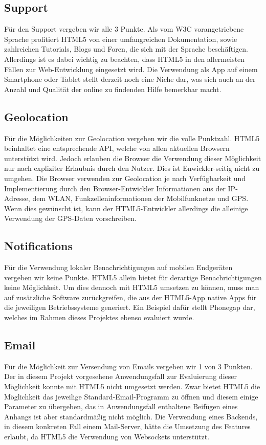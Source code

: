 \subsection{Support}
Für den Support vergeben wir alle 3 Punkte. Als vom W3C vorangetriebene Sprache profitiert HTML5 von einer umfangreichen Dokumentation, sowie zahlreichen Tutorials, Blogs und Foren, die sich mit der Sprache beschäftigen. Allerdings ist es dabei wichtig zu beachten, dass HTML5 in den allermeisten Fällen zur Web-Entwicklung eingesetzt wird. Die Verwendung als App auf einem Smartphone oder Tablet stellt derzeit noch eine Niche dar, was sich auch an der Anzahl und Qualität der online zu findenden Hilfe bemerkbar macht.

\subsection{Geolocation}
Für die Möglichkeiten zur Geolocation vergeben wir die volle Punktzahl. HTML5 beinhaltet eine entsprechende API, welche von allen aktuellen Browsern unterstützt wird. Jedoch erlauben die Browser die Verwendung dieser Möglichkeit nur nach expliziter Erlaubnis durch den Nutzer. Dies ist Enwickler-seitig nicht zu umgehen. Die Browser verwenden zur Geolocation je nach Verfügbarkeit und Implementierung durch den Browser-Entwickler Informationen aus der IP-Adresse, dem WLAN, Funkzelleninformationen der Mobilfunknetze und GPS. Wenn dies gewünscht ist, kann der HTML5-Entwickler allerdings die alleinige Verwendung der GPS-Daten vorschreiben.

\subsection{Notifications}
Für die Verwendung lokaler Benachrichtigungen auf mobilen Endgeräten vergeben wir keine Punkte. HTML5 allein bietet für derartige Benachrichtigungen keine Möglichkeit. Um dies dennoch mit HTML5 umsetzen zu können, muss man auf zusätzliche Software zurückgreifen, die aus der HTML5-App native Apps für die jeweiligen Betriebssysteme generiert. Ein Beispiel dafür stellt Phonegap dar, welches im Rahmen dieses Projektes ebenso evaluiert wurde.

\subsection{Email}
Für die Möglichkeit zur Versendung von Emails vergeben wir 1 von 3 Punkten. Der in diesem Projekt vorgesehene Anwendungsfall zur Evaluierung dieser Möglichkeit konnte mit HTML5 nicht umgesetzt werden. Zwar bietet HTML5 die Möglichkeit das jeweilige Standard-Email-Programm zu öffnen und diesem einige Parameter zu übergeben, das in Anwendungsfall enthaltene Beifügen eines Anhangs ist aber standardmäßig nicht möglich. Die Verwendung eines Backends, in diesem konkreten Fall einem Mail-Server, hätte die Umsetzung des Features erlaubt, da HTML5 die Verwendung von Websockets unterstützt.

